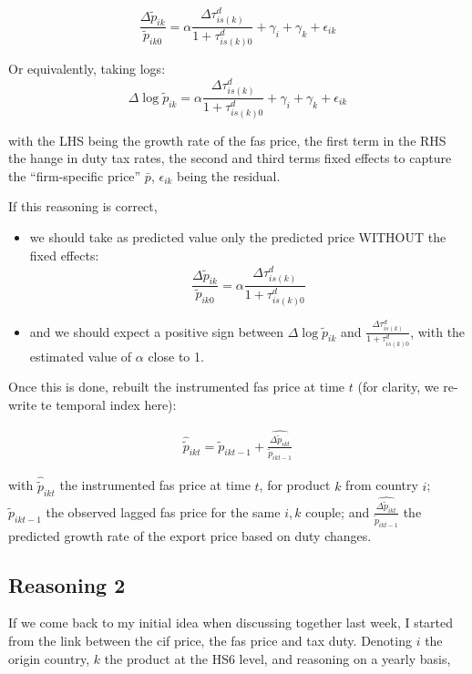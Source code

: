\documentclass[11pt,twoside, authoryear]{elsarticle}
\begin{document}
$$\frac{\Delta \widetilde{p}_{ik}}{\widetilde{p}_{ik0}} = \alpha \frac{\Delta \tau^d_{is(k)}}{1+\tau_{is(k)0}^d} + \gamma_{i} +\gamma_{k}+\epsilon_{ik}$$

Or equivalently, taking logs:
$$\Delta \log \widetilde{p}_{ik}= \alpha\frac{\Delta \tau^d_{is(k)}}{1+\tau_{is(k)0}^d} +\gamma_{i} +\gamma_{k}+\epsilon_{ik}$$


\noindent with the LHS being the growth rate of the fas price, the first term in the RHS the hange in duty tax rates, the second and third terms fixed effects to capture the ``firm-specific price'' $\bar{p}$, $\epsilon_{ik}$ being the residual.

If this reasoning is correct,
\begin{itemize}
\item we should take as predicted value only the predicted price WITHOUT the fixed effects:
$$\widehat{\frac{\Delta \widetilde{p}_{ik}}{\widetilde{p}_{ik0}}} = \alpha\frac{\Delta \tau^d_{is(k)}}{1+\tau_{is(k)0}^d} $$
\item and we should expect a positive sign between $\Delta \log \widetilde{p}_{ik}$ and $\frac{\Delta \tau^d_{is(k)}}{1+\tau_{is(k)0}^d} $, with the estimated value of $\alpha$ close to 1.
\end{itemize}

Once this is done, rebuilt the instrumented fas price at time $t$ (for clarity, we re-write te temporal index here):

\begin{eqnarray*}
\widehat{\widetilde{p}}_{ikt} = \widetilde{p}_{ikt-1}+ \widehat{\frac{\Delta \widetilde{p}_{ikt}}{\widetilde{p}_{ikt-1}}}
\end{eqnarray*}

with $\widehat{\widetilde{p}}_{ikt}$ the instrumented fas price at time $t$, for product $k$ from country $i$; $\widetilde{p}_{ikt-1}$ the observed lagged fas price for the same $i,k$ couple; and $ \widehat{\frac{\Delta \widetilde{p}_{ikt}}{\widetilde{p}_{ikt-1}}}$ the predicted growth rate of the export price based on duty changes.



\subsection{Reasoning 2}


If we come back to my initial idea when discussing together last week, I started from the link between the cif price, the fas price and tax duty.
Denoting $i$ the origin country, $k$ the product at the HS6 level, and reasoning on a yearly basis,
\end{document}
